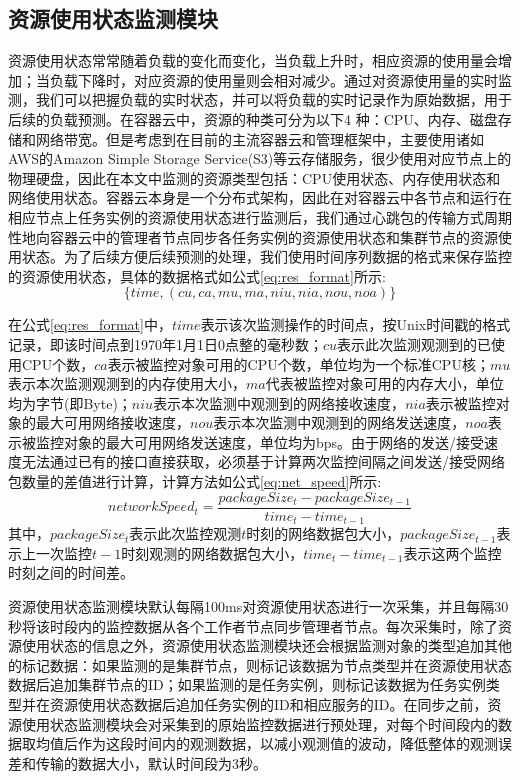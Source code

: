 \subsection{资源使用状态监测模块}\label{sec:monitor}
资源使用状态常常随着负载的变化而变化，当负载上升时，相应资源的使用量会增加；当负载下降时，对应资源的使用量则会相对减少。通过对资源使用量的实时监测，我们可以把握负载的实时状态，并可以将负载的实时记录作为原始数据，用于后续的负载预测。在容器云中，资源的种类可分为以下4 种：CPU、内存、磁盘存储和网络带宽。但是考虑到在目前的主流容器云和管理框架中，主要使用诸如AWS的Amazon Simple Storage Service(S3)等云存储服务，很少使用对应节点上的物理硬盘，因此在本文中监测的资源类型包括：CPU使用状态、内存使用状态和网络使用状态。容器云本身是一个分布式架构，因此在对容器云中各节点和运行在相应节点上任务实例的资源使用状态进行监测后，我们通过心跳包的传输方式周期性地向容器云中的管理者节点同步各任务实例的资源使用状态和集群节点的资源使用状态。为了后续方便后续预测的处理，我们使用时间序列数据的格式来保存监控的资源使用状态，具体的数据格式如公式\ref{eq:res_format}所示:
\begin{equation}\label{eq:res_format}
\{time, (cu, ca, mu, ma, niu, nia, nou, noa)\}
\end{equation}

在公式\ref{eq:res_format}中，$time$表示该次监测操作的时间点，按Unix时间戳的格式记录，即该时间点到1970年1月1日0点整的毫秒数；$cu$表示此次监测观测到的已使用CPU个数，$ca$表示被监控对象可用的CPU个数，单位均为一个标准CPU核；$mu$表示本次监测观测到的内存使用大小，$ma$代表被监控对象可用的内存大小，单位均为字节(即Byte)；$niu$表示本次监测中观测到的网络接收速度，$nia$表示被监控对象的最大可用网络接收速度，$nou$表示本次监测中观测到的网络发送速度，$noa$表示被监控对象的最大可用网络发送速度，单位均为bps。由于网络的发送/接受速度无法通过已有的接口直接获取，必须基于计算两次监控间隔之间发送/接受网络包数量的差值进行计算，计算方法如公式\ref{eq:net_speed}所示:
\begin{equation}\label{eq:net_speed}
networkSpeed_t = \frac{packageSize_t-packageSize_{t-1}}{time_t-time_{t-1}}
\end{equation}
其中，$packageSize_t$表示此次监控观测$t$时刻的网络数据包大小，$packageSize_{t-1}$表示上一次监控${t-1}$时刻观测的网络数据包大小，$time_t-time_{t-1}$表示这两个监控时刻之间的时间差。

资源使用状态监测模块默认每隔100ms对资源使用状态进行一次采集，并且每隔30秒将该时段内的监控数据从各个工作者节点同步管理者节点。每次采集时，除了资源使用状态的信息之外，资源使用状态监测模块还会根据监测对象的类型追加其他的标记数据：如果监测的是集群节点，则标记该数据为节点类型并在资源使用状态数据后追加集群节点的ID；如果监测的是任务实例，则标记该数据为任务实例类型并在资源使用状态数据后追加任务实例的ID和相应服务的ID。在同步之前，资源使用状态监测模块会对采集到的原始监控数据进行预处理，对每个时间段内的数据取均值后作为这段时间内的观测数据，以减小观测值的波动，降低整体的观测误差和传输的数据大小，默认时间段为3秒。


